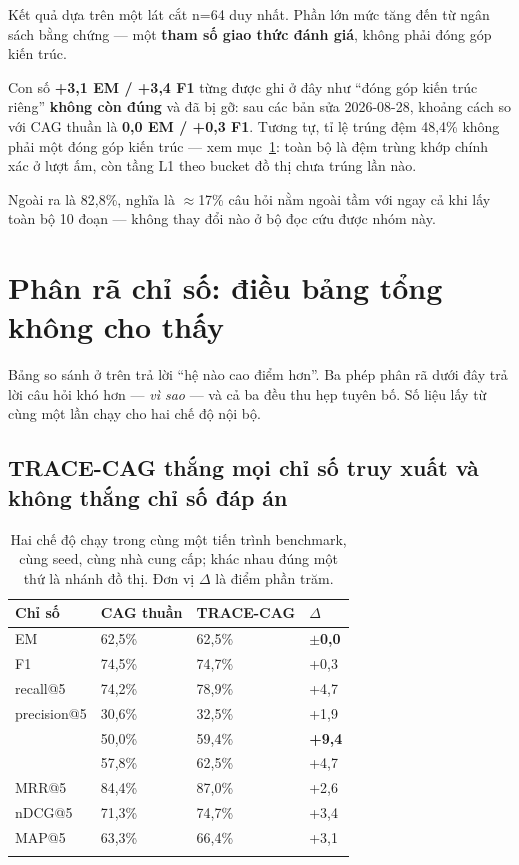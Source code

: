 \begin{luuy}
Kết quả dựa trên một lát cắt n=64 duy nhất. Phần lớn mức tăng đến từ ngân sách bằng
chứng --- một \textbf{tham số giao thức đánh giá}, không phải đóng góp kiến trúc.

Con số \textbf{+3,1 EM / +3,4 F1} từng được ghi ở đây như ``đóng góp kiến trúc riêng''
\textbf{không còn đúng} và đã bị gỡ: sau các bản sửa 2026-08-28, khoảng cách so với CAG
thuần là \textbf{0,0 EM / +0,3 F1}. Tương tự, tỉ lệ trúng đệm 48,4\% không phải một đóng
góp kiến trúc --- xem mục~\ref{sec:tracecag-cache-decomp}: toàn bộ là đệm trùng khớp
chính xác ở lượt ấm, còn tầng L1 theo bucket đồ thị chưa trúng lần nào.

Ngoài ra  là 82,8\%, nghĩa là $\approx$17\% câu hỏi nằm ngoài
tầm với ngay cả khi lấy toàn bộ 10 đoạn --- không thay đổi nào ở bộ đọc cứu được nhóm này.
\end{luuy}

\section{Phân rã chỉ số: điều bảng tổng không cho thấy}
\label{sec:tracecag-cache-decomp}

Bảng so sánh ở trên trả lời ``hệ nào cao điểm hơn''. Ba phép phân rã dưới đây trả lời câu
hỏi khó hơn --- \emph{vì sao} --- và cả ba đều thu hẹp tuyên bố. Số liệu lấy từ cùng một
lần chạy  cho hai chế độ nội bộ.

\subsection{TRACE-CAG thắng mọi chỉ số truy xuất và không thắng chỉ số đáp án}

\begin{longtable}{L{4.6cm} R{2.6cm} R{2.6cm} R{2.0cm}}
\toprule
\textbf{Chỉ số} & \textbf{CAG thuần} & \textbf{TRACE-CAG} & \textbf{$\Delta$}\\
\midrule
\endhead
EM & 62,5\% & 62,5\% & \textbf{$\pm$0,0}\\
F1 & 74,5\% & 74,7\% & +0,3\\
\midrule
recall@5 & 74,2\% & 78,9\% & +4,7\\
precision@5 & 30,6\% & 32,5\% & +1,9\\
 & 50,0\% & 59,4\% & \textbf{+9,4}\\
 & 57,8\% & 62,5\% & +4,7\\
MRR@5 & 84,4\% & 87,0\% & +2,6\\
nDCG@5 & 71,3\% & 74,7\% & +3,4\\
MAP@5 & 63,3\% & 66,4\% & +3,1\\
\bottomrule
\caption{Hai chế độ chạy trong cùng một tiến trình benchmark, cùng seed, cùng nhà cung
cấp; khác nhau đúng một thứ là nhánh đồ thị. Đơn vị $\Delta$ là điểm phần trăm.}
\end{longtable}

